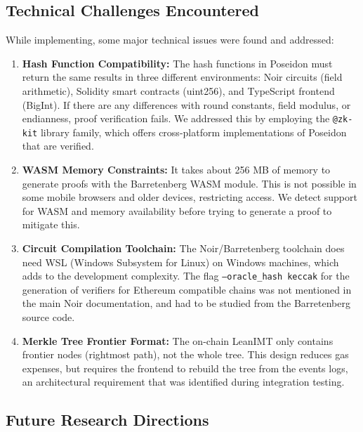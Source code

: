 \documentclass[12pt, a4paper]{report}
\begin{document}
\subsection{Technical Challenges Encountered}

While implementing, some major technical issues were found and addressed:

\begin{enumerate}
    \item \textbf{Hash Function Compatibility:} The hash functions in Poseidon must return the same results in three different environments: Noir circuits (field arithmetic), Solidity smart contracts (uint256), and TypeScript frontend (BigInt). If there are any differences with round constants, field modulus, or endianness, proof verification fails. We addressed this by employing the \texttt{@zk-kit} library family, which offers cross-platform implementations of Poseidon that are verified.
    
    \item \textbf{WASM Memory Constraints:}  It takes about 256 MB of memory to generate proofs with the Barretenberg WASM module. This is not possible in some mobile browsers and older devices, restricting access. We detect support for WASM and memory availability before trying to generate a proof to mitigate this.
    
    \item \textbf{Circuit Compilation Toolchain:}  The Noir/Barretenberg toolchain does need WSL (Windows Subsystem for Linux) on Windows machines, which adds to the development complexity. The flag \texttt{--oracle\_hash keccak} for the generation of verifiers for Ethereum compatible chains was not mentioned in the main Noir documentation, and had to be studied from the Barretenberg source code.
    
    \item \textbf{Merkle Tree Frontier Format:} The on-chain LeanIMT only contains frontier nodes (rightmost path), not the whole tree. This design reduces gas expenses, but requires the frontend to rebuild the tree from the events logs, an architectural requirement that was identified during integration testing.
\end{enumerate}

\subsection{Future Research Directions}
\end{document}
